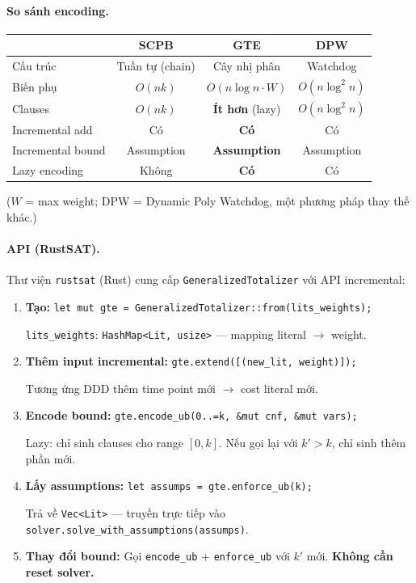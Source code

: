 \documentclass[11pt,a4paper]{article}
\begin{document}
\paragraph{So sánh encoding.}
\begin{center}
\begin{tabular}{lccc}
\toprule
 & \textbf{SCPB} & \textbf{GTE} & \textbf{DPW} \\
\midrule
Cấu trúc & Tuần tự (chain) & Cây nhị phân & Watchdog \\
Biến phụ & $O(nk)$ & $O(n \log n \cdot W)$ & $O(n \log^2 n)$ \\
Clauses & $O(nk)$ & \textbf{Ít hơn} (lazy) & $O(n \log^2 n)$ \\
Incremental add & Có & \textbf{Có} & Có \\
Incremental bound & Assumption & \textbf{Assumption} & Assumption \\
Lazy encoding & Không & \textbf{Có} & Có \\
\bottomrule
\end{tabular}
\end{center}

($W$ = max weight; DPW = Dynamic Poly Watchdog, một phương pháp thay thế khác.)

\paragraph{API (RustSAT).}
Thư viện \texttt{rustsat} (Rust) cung cấp \texttt{GeneralizedTotalizer} với API incremental:

\begin{enumerate}
  \item \textbf{Tạo:} \texttt{let mut gte = GeneralizedTotalizer::from(lits\_weights);}
  
  \texttt{lits\_weights}: \texttt{HashMap<Lit, usize>} --- mapping literal $\to$ weight.
  
  \item \textbf{Thêm input incremental:} \texttt{gte.extend([(new\_lit, weight)]);}
  
  Tương ứng DDD thêm time point mới $\to$ cost literal mới.
  
  \item \textbf{Encode bound:} \texttt{gte.encode\_ub(0..=k, \&mut cnf, \&mut vars);}
  
  Lazy: chỉ sinh clauses cho range $[0, k]$. Nếu gọi lại với $k' > k$, chỉ sinh thêm phần mới.
  
  \item \textbf{Lấy assumptions:} \texttt{let assumps = gte.enforce\_ub(k);}
  
  Trả về \texttt{Vec<Lit>} --- truyền trực tiếp vào \texttt{solver.solve\_with\_assumptions(assumps)}.
  
  \item \textbf{Thay đổi bound:} Gọi \texttt{encode\_ub} + \texttt{enforce\_ub} với $k'$ mới. \textbf{Không cần reset solver.}
\end{enumerate}
\end{document}
